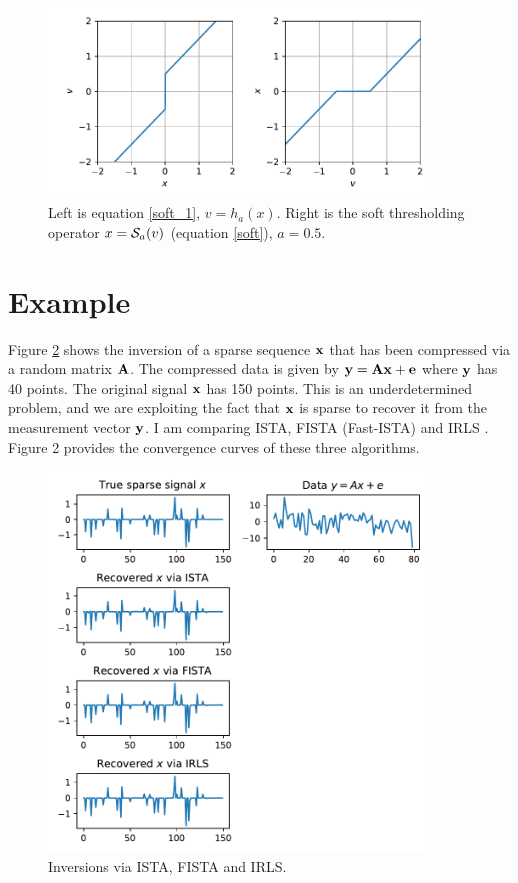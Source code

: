 \documentclass[11pt, oneside]{article}  	%
\begin{document}
\begin{figure}[ht!]
  \centering
  \includegraphics[width=0.9\textwidth]{soft.pdf} 
  \caption{Left is equation \ref{soft_1},  $v=h_a(x)$. Right is the soft thresholding operator $x={\cal S}_{a}(v)$ (equation  \ref{soft}), $a=0.5$. }
  \label{fig:0}
\end{figure}


\section{Example}
Figure \ref{fig:1} shows the inversion of a sparse sequence $\bf x$ that has been compressed via a random matrix 
$\bf A$. The compressed
data is given by ${\bf y} = {\bf A} {\bf x} + {\bf e}$ where $\bf y$ has 40 points. The original signal $\bf x$ has 150 points. This is an underdetermined problem, and we are exploiting the fact that $\bf x$ is sparse to recover it from
the measurement vector $\bf y$. I am comparing ISTA,  FISTA (Fast-ISTA) \citep{FISTA} and IRLS \citep{Sacchi}. Figure 2 provides
the convergence curves of these three algorithms. 

\begin{figure}[htbp]
  \centering
  \includegraphics[width=0.9\textwidth]{comparison.pdf} 
  \caption{Inversions via ISTA, FISTA and IRLS.}
  \label{fig:1}
\end{figure}
\end{document}
